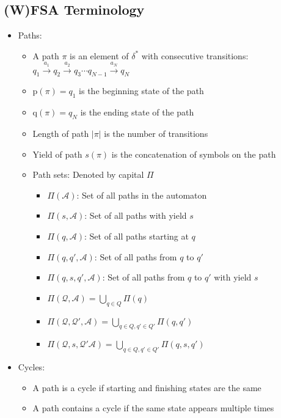 \subsection*{(W)FSA Terminology}
\begin{itemize}
    \item Paths:
    \begin{itemize}
        \item A path $\pi$ is an element of $\delta^*$ with consecutive transitions:
        $
        q_1 \xrightarrow{a_1} q_2 \xrightarrow{a_2} q_3 \cdots q_{N-1} \xrightarrow{a_N} q_N
        $
        \item $\textrm{p}(\pi) = q_1$ is the beginning state of the path
        \item $\textrm{q}(\pi) = q_N$ is the ending state of the path
        \item Length of path $|\pi|$ is the number of transitions
        \item Yield of path $s(\pi)$ is the concatenation of symbols on the path
        \item Path sets: Denoted by capital $\Pi$
        \begin{itemize}
            \item $\Pi(\mathcal{A})$: Set of all paths in the automaton
            \item $\Pi(s, \mathcal{A})$: Set of all paths with yield $s$
            \item $\Pi(q, \mathcal{A})$: Set of all paths starting at $q$
            \item $\Pi(q, q', \mathcal{A})$: Set of all paths from $q$ to $q'$
            \item $\Pi(q, s, q', \mathcal{A})$: Set of all paths from $q$ to $q'$ with yield $s$
            \item $\Pi(\mathcal{Q}, \mathcal{A}) = \bigcup_{q \in Q} \Pi(q)$
            \item $\Pi(\mathcal{Q}, \mathcal{Q}', \mathcal{A}) = \bigcup_{q \in Q, q' \in Q'} \Pi(q, q')$
            \item $\Pi(\mathcal{Q}, s, \mathcal{Q}' \mathcal{A}) = \bigcup_{q \in Q, q' \in Q'} \Pi(q,s,q')$
        \end{itemize}
    \end{itemize}

    \item Cycles:
    \begin{itemize}
        \item A path is a cycle if starting and finishing states are the same
        \item A path contains a cycle if the same state appears multiple times
    \end{itemize}


\end{itemize}

